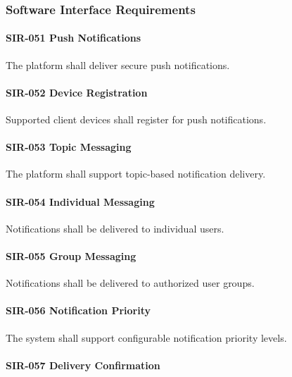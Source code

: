 
\subsubsection*{Software Interface Requirements}

\paragraph{SIR-051 Push Notifications}

The platform shall deliver secure push notifications.

\paragraph{SIR-052 Device Registration}

Supported client devices shall register for push notifications.

\paragraph{SIR-053 Topic Messaging}

The platform shall support topic-based notification delivery.

\paragraph{SIR-054 Individual Messaging}

Notifications shall be delivered to individual users.

\paragraph{SIR-055 Group Messaging}

Notifications shall be delivered to authorized user groups.

\paragraph{SIR-056 Notification Priority}

The system shall support configurable notification priority levels.

\paragraph{SIR-057 Delivery Confirmation}


